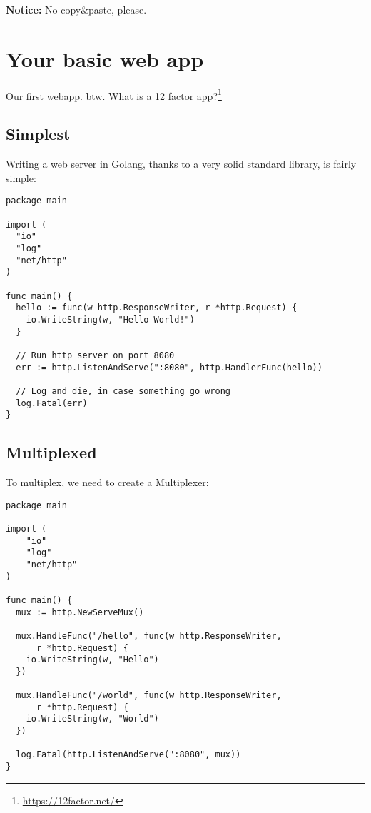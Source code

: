 \documentclass[11pt, letterpaper]{article}
\begin{document}
\bigskip
\textbf{Notice:} No copy\&paste, please.

\pagebreak
\section{Your basic web app}

Our first webapp. btw. What is a 12 factor app?\footnote{\href{https://12factor.net/}{https://12factor.net/}}

\subsection{Simplest}

Writing a web server in Golang, thanks to a very solid standard library, is fairly simple:

\begin{verbatim}
package main

import (
  "io"
  "log"
  "net/http"
)

func main() {
  hello := func(w http.ResponseWriter, r *http.Request) {
    io.WriteString(w, "Hello World!")
  }

  // Run http server on port 8080
  err := http.ListenAndServe(":8080", http.HandlerFunc(hello))

  // Log and die, in case something go wrong
  log.Fatal(err)
}
\end{verbatim}

\subsection{Multiplexed}

To multiplex, we need to create a Multiplexer:

\begin{verbatim}
package main

import (
    "io"
    "log"
    "net/http"
)

func main() {
  mux := http.NewServeMux()

  mux.HandleFunc("/hello", func(w http.ResponseWriter,
      r *http.Request) {
    io.WriteString(w, "Hello")
  })
  
  mux.HandleFunc("/world", func(w http.ResponseWriter,
      r *http.Request) {
    io.WriteString(w, "World")
  })

  log.Fatal(http.ListenAndServe(":8080", mux))
}
\end{verbatim}
\end{document}
